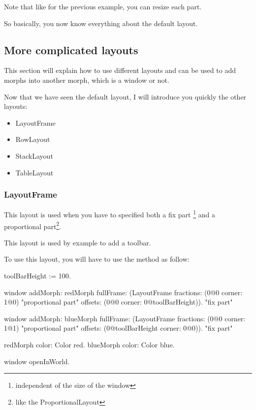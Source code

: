 \documentclass[a4paper,10pt,twoside]{book}
\begin{document}
Note that like for the previous example, you can resize each part.

So basically, you now know everything about the default layout.


%
%


\subsection{More complicated layouts}

This section will explain how to use different layouts and can be used to add morphs into another morph, which is a window or not.

Now that we have seen the default layout, I will introduce you quickly the other layouts:
\begin{itemize}
	\item LayoutFrame
	\item RowLayout
	\item StackLayout
	\item TableLayout
\end{itemize}

\subsubsection{LayoutFrame}

This layout is used when you have to specified both a fix part \footnote{independent of the size of the window} and a proportional part\footnote{like the ProportionalLayout}.

This layout is used by example to add a toolbar.

To use this layout, you will have to use the method  as follow:

\begin{code}{}
toolBarHeight := 100.

window
	addMorph: redMorph
	fullFrame: (LayoutFrame
				fractions: (0@0 corner: 1@0) "proportional part"
				offsets: (0@0 corner: 0@toolBarHeight)). "fix part"

window
	addMorph: blueMorph
	fullFrame: (LayoutFrame
				fractions: (0@0 corner: 1@1) "proportional part"
				offsets: (0@toolBarHeight corner: 0@0)). "fix part"

redMorph color: Color red.
blueMorph color: Color blue.
	
window openInWorld.
\end{code}
\end{document}
